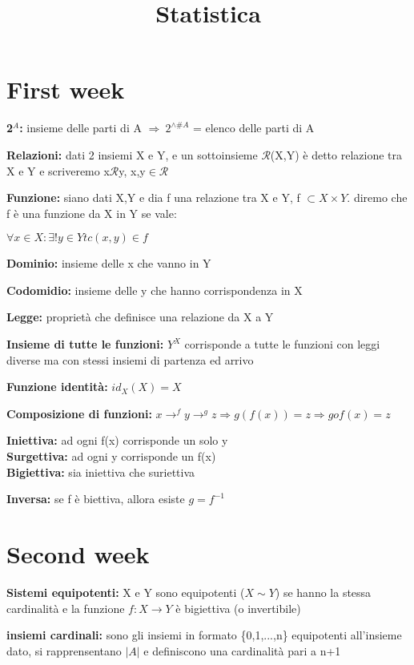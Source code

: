 \documentclass[11pt, letterpaper]{article}
\title{Statistica}
\begin{document}
    
\section{First week}
\textbf{2$^{A}$:} insieme delle parti di A $\Rightarrow\ 2^{\wedge\#A}$ = elenco delle parti di A

\textbf{Relazioni:} dati 2 insiemi X e Y, e un sottoinsieme $\mathcal{R}$(X,Y) è detto relazione tra 
X e Y e scriveremo x$\mathcal{R}$y, x,y$\in\mathcal{R}$

\textbf{Funzione:} siano dati X,Y e dia f una relazione tra X e Y, f $\subset X\times Y$.
diremo che f è una funzione da X in Y se vale:
\begin{center}
    $\forall x \in X: \exists ! y \in Y tc (x,y)\in f$
\end{center}

\textbf{Dominio:} insieme delle x che vanno in Y

\textbf{Codomidio:} insieme delle y che hanno corrispondenza in X

\textbf{Legge:} proprietà che definisce una relazione da X a Y

\textbf{Insieme di tutte le funzioni:} $Y^{X}$ corrisponde a tutte le funzioni con leggi diverse ma
con stessi insiemi di partenza ed arrivo

\textbf{Funzione identità:} $id_{X}(X) = X$

\textbf{Composizione di funzioni:} $x\rightarrow^{f} y\rightarrow^{g} z \Rightarrow g(f(x)) = z
\Rightarrow gof(x) = z$ 

\textbf{Iniettiva:} ad ogni f(x) corrisponde un solo y\\
\textbf{Surgettiva:} ad ogni y corrisponde un f(x)\\
\textbf{Bigiettiva:} sia iniettiva che suriettiva

\textbf{Inversa:} se f è biettiva, allora esiste $g=f^{-1}$

\newpage
\section{Second week}

\textbf{Sistemi equipotenti:} X e Y sono equipotenti ($X\sim Y$) se hanno la stessa
cardinalità e la funzione $f:X\rightarrow Y$ è bigiettiva (o invertibile)

\textbf{insiemi cardinali:} sono gli insiemi in formato \{0,1,...,n\} equipotenti all'insieme dato, si 
rapprensentano $|A|$ e definiscono una cardinalità pari a n+1
\end{document}
